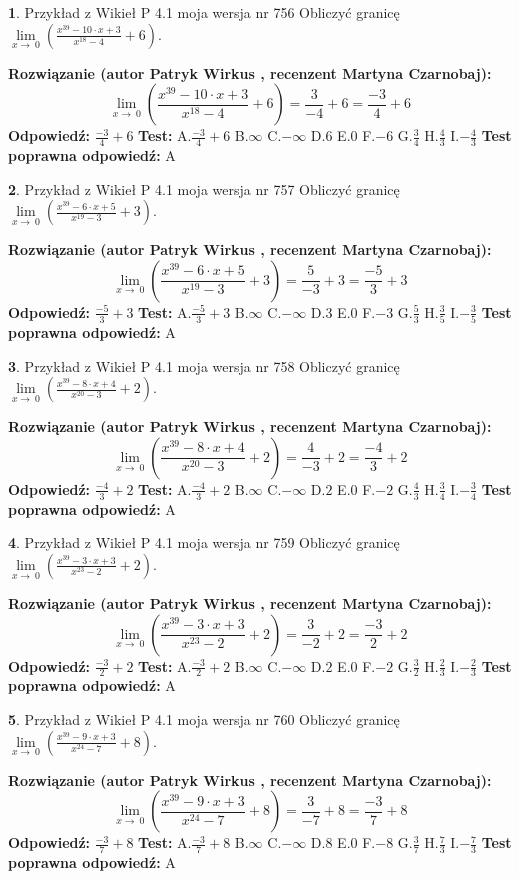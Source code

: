 \documentclass[12pt, a4paper]{article}
\theoremstyle{definition} %
\newtheorem{zad}{}
\newcommand{\zadStart}[1]{\begin{zad}#1\newline}
\newcommand{\zadStop}{\end{zad}}
\newcommand{\rozwStart}[2]{\noindent \textbf{Rozwiązanie (autor #1 , recenzent #2): }\newline}
\newcommand{\rozwStop}{\newline}
\newcommand{\odpStart}{\noindent \textbf{Odpowiedź:}\newline}
\newcommand{\odpStop}{\newline}
\newcommand{\testStart}{\noindent \textbf{Test:}\newline}
\newcommand{\testStop}{\newline}
\newcommand{\kluczStart}{\noindent \textbf{Test poprawna odpowiedź:}\newline}
\newcommand{\kluczStop}{\newline}
\begin{document}
\zadStart{Przykład z Wikieł P 4.1 moja wersja nr 756}
Obliczyć granicę $\lim\limits_{x\to\ 0}(\frac{x^{39}-10 \cdot x +3}{x^{18}-4}+6)$.
\zadStop
\rozwStart{Patryk Wirkus}{Martyna Czarnobaj}
$$\lim\limits_{x\to\ 0}(\frac{x^{39}-10 \cdot x +3}{x^{18}-4}+6)=\frac{3}{-4}+6=\frac{-3}{4}+6$$
\rozwStop
\odpStart
$\frac{-3}{4}+6$
\odpStop
\testStart
A.$\frac{-3}{4}+6$
B.$\infty$
C.$-\infty$
D.$6$
E.$0$
F.$-6$
G.$\frac{3}{4}$
H.$\frac{4}{3}$
I.$-\frac{4}{3}$
\testStop
\kluczStart
A
\kluczStop



\zadStart{Przykład z Wikieł P 4.1 moja wersja nr 757}
Obliczyć granicę $\lim\limits_{x\to\ 0}(\frac{x^{39}-6 \cdot x +5}{x^{19}-3}+3)$.
\zadStop
\rozwStart{Patryk Wirkus}{Martyna Czarnobaj}
$$\lim\limits_{x\to\ 0}(\frac{x^{39}-6 \cdot x +5}{x^{19}-3}+3)=\frac{5}{-3}+3=\frac{-5}{3}+3$$
\rozwStop
\odpStart
$\frac{-5}{3}+3$
\odpStop
\testStart
A.$\frac{-5}{3}+3$
B.$\infty$
C.$-\infty$
D.$3$
E.$0$
F.$-3$
G.$\frac{5}{3}$
H.$\frac{3}{5}$
I.$-\frac{3}{5}$
\testStop
\kluczStart
A
\kluczStop



\zadStart{Przykład z Wikieł P 4.1 moja wersja nr 758}
Obliczyć granicę $\lim\limits_{x\to\ 0}(\frac{x^{39}-8 \cdot x +4}{x^{20}-3}+2)$.
\zadStop
\rozwStart{Patryk Wirkus}{Martyna Czarnobaj}
$$\lim\limits_{x\to\ 0}(\frac{x^{39}-8 \cdot x +4}{x^{20}-3}+2)=\frac{4}{-3}+2=\frac{-4}{3}+2$$
\rozwStop
\odpStart
$\frac{-4}{3}+2$
\odpStop
\testStart
A.$\frac{-4}{3}+2$
B.$\infty$
C.$-\infty$
D.$2$
E.$0$
F.$-2$
G.$\frac{4}{3}$
H.$\frac{3}{4}$
I.$-\frac{3}{4}$
\testStop
\kluczStart
A
\kluczStop



\zadStart{Przykład z Wikieł P 4.1 moja wersja nr 759}
Obliczyć granicę $\lim\limits_{x\to\ 0}(\frac{x^{39}-3 \cdot x +3}{x^{23}-2}+2)$.
\zadStop
\rozwStart{Patryk Wirkus}{Martyna Czarnobaj}
$$\lim\limits_{x\to\ 0}(\frac{x^{39}-3 \cdot x +3}{x^{23}-2}+2)=\frac{3}{-2}+2=\frac{-3}{2}+2$$
\rozwStop
\odpStart
$\frac{-3}{2}+2$
\odpStop
\testStart
A.$\frac{-3}{2}+2$
B.$\infty$
C.$-\infty$
D.$2$
E.$0$
F.$-2$
G.$\frac{3}{2}$
H.$\frac{2}{3}$
I.$-\frac{2}{3}$
\testStop
\kluczStart
A
\kluczStop



\zadStart{Przykład z Wikieł P 4.1 moja wersja nr 760}
Obliczyć granicę $\lim\limits_{x\to\ 0}(\frac{x^{39}-9 \cdot x +3}{x^{24}-7}+8)$.
\zadStop
\rozwStart{Patryk Wirkus}{Martyna Czarnobaj}
$$\lim\limits_{x\to\ 0}(\frac{x^{39}-9 \cdot x +3}{x^{24}-7}+8)=\frac{3}{-7}+8=\frac{-3}{7}+8$$
\rozwStop
\odpStart
$\frac{-3}{7}+8$
\odpStop
\testStart
A.$\frac{-3}{7}+8$
B.$\infty$
C.$-\infty$
D.$8$
E.$0$
F.$-8$
G.$\frac{3}{7}$
H.$\frac{7}{3}$
I.$-\frac{7}{3}$
\testStop
\kluczStart
A
\kluczStop
\end{document}
